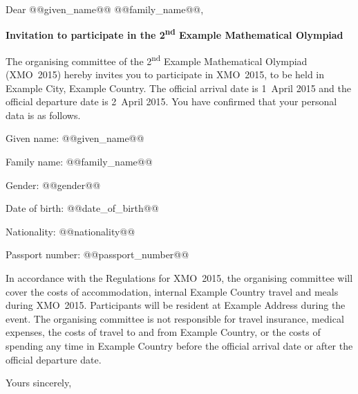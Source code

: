 \documentclass[a4paper]{letter}
\begin{document}
\address{Example Mathematical Olympiad \\
  Example Address}
\signature{Example Signature}
\begin{letter}{}

\opening{Dear @@given_name@@ @@family_name@@,}

\begin{center}
\textbf{Invitation to participate in the 2\textsuperscript{nd} Example
  Mathematical Olympiad}
\end{center}

The organising committee of the 2\textsuperscript{nd} Example
Mathematical Olympiad (XMO~2015) hereby invites you to participate in
XMO~2015, to be held in Example City, Example Country.  The official
arrival date is 1~April 2015 and the official departure date is
2~April 2015.  You have confirmed that your personal data is as
follows.

\noindent Given name: @@given_name@@

\noindent Family name: @@family_name@@

\noindent Gender: @@gender@@

\noindent Date of birth: @@date_of_birth@@

\noindent Nationality: @@nationality@@

\noindent Passport number: @@passport_number@@

In accordance with the Regulations for XMO~2015, the organising
committee will cover the costs of accommodation, internal Example
Country travel and meals during XMO~2015.  Participants will be
resident at Example Address during the event.  The organising
committee is not responsible for travel insurance, medical expenses,
the costs of travel to and from Example Country, or the costs of
spending any time in Example Country before the official arrival date
or after the official departure date.

\closing{Yours sincerely,}

\end{letter}
\end{document}
